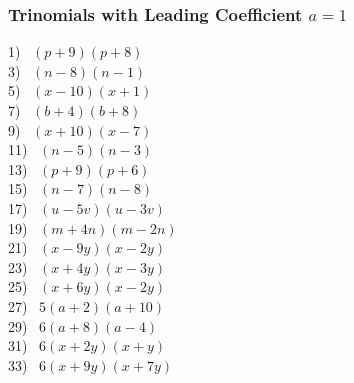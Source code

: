 \documentclass[11pt]{book}
\newcommand{\tmstrong}[1]{\textbf{#1}}
\theoremstyle{definition}  %
\begin{document}

\subsubsection{Trinomials with Leading Coefficient $a=1$}

\begin{multicols}{2}
  1)~ $(p+9)(p+8)$\\
  3)~ $(n-8)(n-1)$\\
  5)~ $(x-10)(x+1)$\\
  7)~ $(b+4)(b+8)$\\
  9)~ $(x+10)(x-7)$\\
  11)~ $(n-5)(n-3)$\\
  13)~ $(p+9)(p+6)$\\
  15)~ $(n-7)(n-8)$\\
  17)~ $(u-5v)(u-3v)$\\
  19)~ $(m+4n)(m-2n)$\\
  21)~ $(x-9y)(x-2y)$\\
  23)~ $(x+4y)(x-3y)$\\
  25)~ $(x+6y)(x-2y)$\\
  27)~ $5(a+2)(a+10)$\\
  29)~ $6(a+8)(a-4)$\\
  31)~ $6(x+2y)(x+y)$\\
  33)~ $6(x+9y)(x+7y)$%
\end{multicols}
\end{document}
